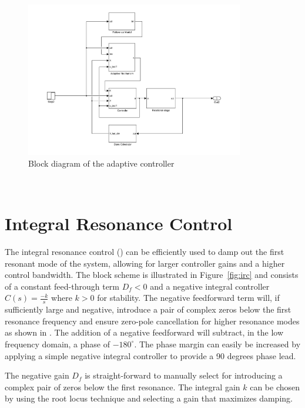 \begin{figure}[h]
  \centering %
  \includegraphics[width=0.85\textwidth, trim=5cm 0cm 3.8cm 0cm, clip=true]{fig/matlab/adaptive_scheme}
  \caption{\label{fig:adaptive}Block diagram of the adaptive controller}
\end{figure}

\newpage~\newpage~
\FloatBarrier
\section{Integral Resonance Control}\label{sec:irc}
The integral resonance control (\abbrIRC) can be efficiently used to damp out the first resonant mode of the system, allowing for larger controller gains and a higher control bandwidth. The \abbrIRC block scheme is illustrated in Figure~\ref{fig:irc} and consists of a constant feed-through term $D_f<0$ and a negative integral controller $C(s)=\frac{-k}{s}$ where $k>0$ for stability. The negative feedforward term will, if sufficiently large and negative, introduce a pair of complex zeros below the first resonance frequency and ensure zero-pole cancellation for higher resonance modes as shown in \citep{Aphale:2007}. The addition of a negative feedforward will subtract, in the low frequency domain, a phase of $-180^{\circ}$. The phase margin can easily be increased by applying a simple negative integral controller to provide a 90 degrees phase lead.

The negative gain $D_f$ is straight-forward to manually select for introducing a complex pair of zeros below the first resonance. The integral gain $k$ can be chosen by using the root locus technique and selecting a gain that maximizes damping.


